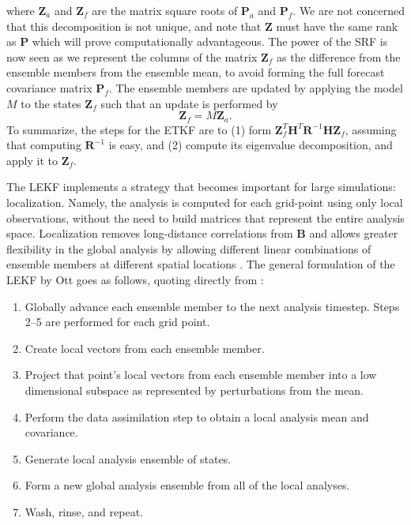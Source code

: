 \documentclass[10pt,letterpaper]{article}
\newcommand{\mbR}{\mathbf{R}}
\newcommand{\mbH}{\mathbf{H}}
\newcommand{\mbP}{\mathbf{P}}
\newcommand{\mbZ}{\mathbf{Z}}
\begin{document}
where $\mbZ_a$ and $\mbZ_f$ are the matrix square roots of $\mbP_a$ and $\mbP_f$.
We are not concerned that this decomposition is not unique, and note that $\mbZ$ must have the same rank as $\mbP$ which will prove computationally advantageous.
The power of the SRF is now seen as we represent the columns of the matrix $\mbZ_f$ as the difference from the ensemble members from the ensemble mean, to avoid forming the full forecast covariance matrix $\mbP_f$.
The ensemble members are updated by applying the model $M$ to the states $\mbZ_f$ such that an update is performed by
\begin{equation} \mbZ_f = M \mbZ_a .\end{equation}
To summarize, the steps for the ETKF are to (1) form $\mbZ_f^T\mbH^T\mbR^{-1}\mbH\mbZ_f$, assuming that computing $\mathbf{R}^{-1}$ is easy, and (2) compute its eigenvalue decomposition, and apply it to $\mbZ_f$.

The LEKF implements a strategy that becomes important for large simulations: localization.
Namely, the analysis is computed for each grid-point using only local observations, without the need to build matrices that represent the entire analysis space.
Localization removes long-distance correlations from $\mathbf{B}$ and allows greater flexibility in the global analysis by allowing different linear combinations of ensemble members at different spatial locations \cite{kalnay2007a}.
The general formulation of the LEKF by Ott goes as follows, quoting directly from \cite{ott2004local}:
\begin{enumerate}
\item Globally advance each ensemble member to the next analysis timestep. Steps 2--5 are performed for each grid point.
\item Create local vectors from each ensemble member.
\item Project that point's local vectors from each ensemble member into a low dimensional subspace as represented by perturbations from the mean.
\item Perform the data assimilation step to obtain a local analysis mean and covariance.
\item Generate local analysis ensemble of states.
\item Form a new global analysis ensemble from all of the local analyses.
\item Wash, rinse, and repeat.
\end{enumerate}
\end{document}
